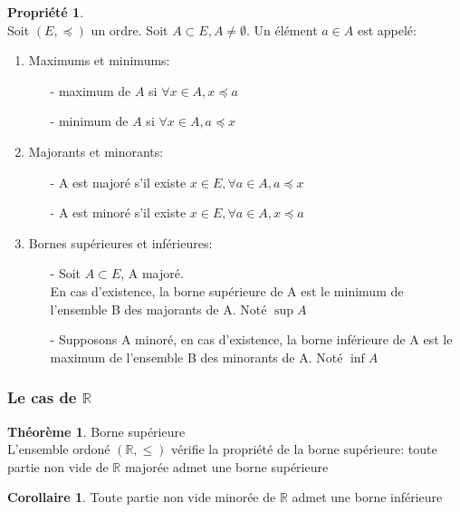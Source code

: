 \documentclass[fleqn]{article}
\theoremstyle{definition} \newtheorem*{defi}{D\'efinition}
\theoremstyle{definition} \newtheorem*{theo}{Th\'eor\`eme}
\theoremstyle{definition} \newtheorem*{coro}{Corollaire}
\theoremstyle{remark} \newtheorem*{rqs}{Remarques}
\theoremstyle{definition} \newtheorem*{prop}{Propri\'et\'e}
\begin{document}
\begin{prop} $ $ \\ Soit \((E, \preceq)\) un ordre. Soit \(A \subset E, A \neq \emptyset\). Un \'el\'ement \(a \in A\) est appel\'e:
	\begin{enumerate}
		\item Maximums et minimums:
			\begin{itemize}
				\item [-] maximum de \(A\) si \(\forall x \in A, x \preceq a\)
				\item [-] minimum de \(A\) si \(\forall x \in A, a \preceq x\)
			\end{itemize}
		\item Majorants et minorants:
			\begin{itemize}
				\item [-] A est major\'e s'il existe \(x \in E, \forall a \in A, a \preceq x\)
				\item [-] A est minor\'e s'il existe \(x \in E, \forall a \in A, x \preceq a\)
			\end{itemize}
		\item Bornes sup\'erieures et inf\'erieures:
			\begin{itemize}
				\item [-] Soit \(A \subset E\), A major\'e. \\
					En cas d'existence, la borne sup\'erieure de A est le minimum de l'ensemble B des majorants de A. Not\'e $\sup A$
				\item [-] Supposons A minor\'e, en cas d'existence, la borne inf\'erieure de A est le maximum de l'ensemble B des minorants de A.
					Not\'e $\inf A$ \\
			\end{itemize}
	\end{enumerate}
\end{prop}

\subsubsection{Le cas de $\mathbb{R}$}
\begin{theo} Borne sup\'erieure \\
	L'ensemble ordon\'e $(\mathbb{R}, \leq)$ v\'erifie la propri\'et\'e de la borne sup\'erieure: toute partie non vide de $\mathbb{R}$
	major\'ee admet une borne sup\'erieure
\end{theo}

\begin{coro}
	Toute partie non vide minor\'ee de $\mathbb{R}$ admet une borne inf\'erieure
\end{coro}
\end{document}
